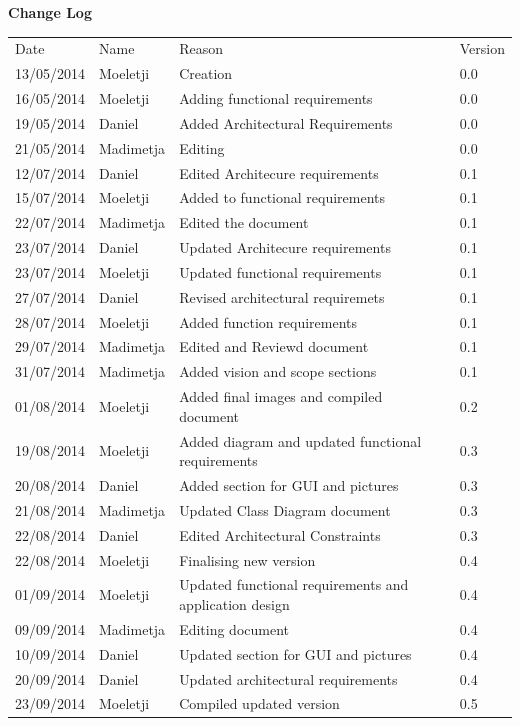 \documentclass[12pt]{article}
\begin{document}
	\newpage		
	\large 
 	{\bf Change Log}\\[1em]
	\begin{tabular}{llll}
		Date & Name & Reason & Version \\
		13/05/2014 & Moeletji & Creation & 0.0 \\
		16/05/2014 & Moeletji & Adding functional requirements & 0.0 \\
		19/05/2014 & Daniel & Added Architectural Requirements & 0.0 \\
		21/05/2014 & Madimetja & Editing & 0.0 \\
		12/07/2014 & Daniel & Edited Architecure requirements & 0.1 \\
		15/07/2014 & Moeletji & Added to functional requirements & 0.1 \\
		22/07/2014 & Madimetja & Edited the document & 0.1 \\
		23/07/2014 & Daniel & Updated Architecure requirements & 0.1\\
		23/07/2014 & Moeletji & Updated functional requirements & 0.1\\
		27/07/2014 & Daniel & Revised architectural requiremets & 0.1\\
		28/07/2014 & Moeletji & Added function requirements & 0.1\\
		29/07/2014 & Madimetja & Edited and Reviewd document & 0.1\\
		31/07/2014 & Madimetja & Added vision and scope sections & 0.1\\
		01/08/2014 & Moeletji & Added final images and compiled document & 0.2\\
		19/08/2014 & Moeletji & Added diagram and updated functional requirements & 0.3\\
        20/08/2014 & Daniel & Added section for GUI and pictures & 0.3\\
        21/08/2014 & Madimetja &  Updated Class Diagram document & 0.3\\
        22/08/2014 & Daniel & Edited Architectural Constraints & 0.3\\
        22/08/2014 & Moeletji & Finalising new version & 0.4\\
        01/09/2014 & Moeletji & Updated functional requirements and application design & 0.4\\
        09/09/2014 & Madimetja & Editing document & 0.4\\
        10/09/2014 & Daniel & Updated section for GUI and pictures & 0.4\\
        20/09/2014 & Daniel & Updated architectural requirements & 0.4\\
        23/09/2014 & Moeletji & Compiled updated version & 0.5\\     
	\end{tabular}
	
\end{document}
